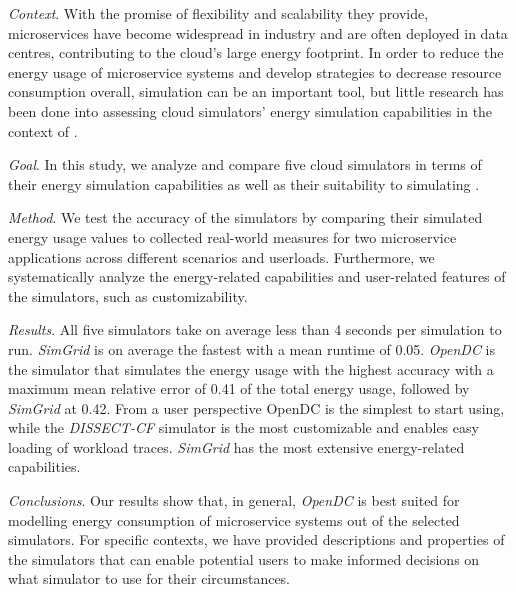 \noindent \textit{Context}. With the promise of flexibility and scalability they provide, microservices have become widespread in industry and are often deployed in data centres, contributing to the cloud's large energy footprint. In order to reduce the energy usage of microservice systems and develop strategies to decrease resource consumption overall, simulation can be an important tool, but little research has been done into assessing cloud simulators' energy simulation capabilities in the context of .

\noindent \textit{Goal}. In this study, we analyze and compare five cloud simulators in terms of their  energy simulation capabilities as well as their suitability to simulating .

\noindent \textit{Method}. We test the accuracy of the simulators by comparing their simulated  energy usage values to collected real-world measures for two microservice applications across different scenarios and userloads. Furthermore, we systematically analyze the energy-related capabilities and user-related features of the simulators, such as customizability.

\noindent \textit{Results}. 
All five simulators take on average less than 4 seconds per simulation to run. \textit{SimGrid} is on average the fastest with a mean runtime of 0.05. 
\textit{OpenDC} is the simulator that simulates the energy usage with the highest accuracy with a maximum mean relative error of 0.41 of the total energy usage, followed by \textit{SimGrid} at 0.42. 
From a user perspective OpenDC is the simplest to start using, while the \textit{DISSECT-CF} simulator is the most customizable and enables easy loading of workload traces. \textit{SimGrid} has the most extensive energy-related capabilities.

\noindent \textit{Conclusions}. Our results show that, in general, \textit{OpenDC} is best suited for modelling  energy consumption of microservice systems out of the selected simulators. For specific contexts, we have provided descriptions and properties of the simulators that can enable potential users to make informed decisions on what simulator to use for their circumstances.

